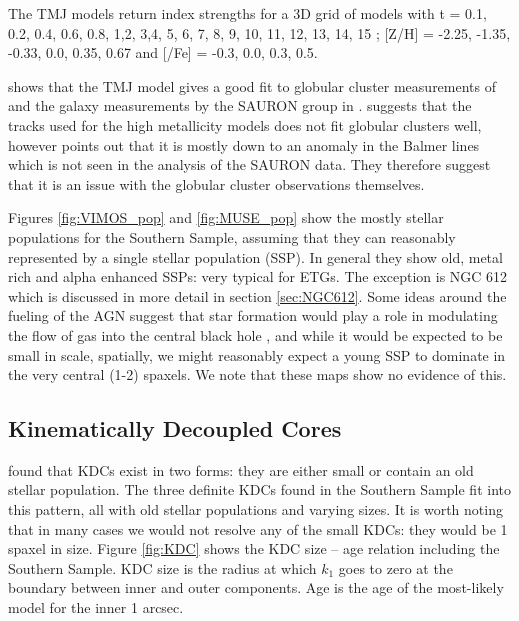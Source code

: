 		The TMJ models return index strengths for a 3D grid of models with t = 0.1, 0.2, 0.4, 0.6, 0.8, 1,2, 3,4, 5, 6, 7, 8, 9, 10, 11, 12, 13, 14, 15 ; [Z/H] = -2.25, -1.35, -0.33, 0.0, 0.35, 0.67 and [\alpha/Fe] = -0.3, 0.0, 0.3, 0.5.  

		\citet{Thomas2010} shows that the TMJ model gives a good fit to globular cluster measurements of \citet{Puzia2002, Schiavon2005} and the galaxy measurements by the SAURON group in \citet{Kuntschner2010}. \citet{Conroy2010} suggests that the \citet{Girardi2000} tracks used for the high metallicity models does not fit globular clusters well, however \citet{Thomas2010} points out that it is mostly down to an anomaly in the Balmer lines which is not seen in the analysis of the SAURON data. They therefore suggest that it is an issue with the globular cluster observations themselves. 

		Figures \ref{fig:VIMOS_pop} and \ref{fig:MUSE_pop} show the mostly stellar populations for the Southern Sample, assuming that they can reasonably represented by a single stellar population (SSP). In general they show old, metal rich and alpha enhanced SSPs: very typical for ETGs. The exception is NGC 612 which is discussed in more detail in section \ref{sec:NGC612}. Some ideas around the fueling of the AGN suggest that star formation would play a role in modulating the flow of gas into the central black hole \citep{}, and while it would be expected to be small in scale, spatially, we might reasonably expect a young SSP to dominate in the very central (1-2) spaxels. We note that these maps show no evidence of this. 


	\subsection{Kinematically Decoupled Cores}
		\label{sec:popKDC}

		\citet{Kuntschner2010} found that KDCs exist in two forms: they are either small or contain an old stellar population. The three definite KDCs found in the Southern Sample fit into this pattern, all with old stellar populations and varying sizes. It is worth noting that in many cases we would not resolve any of the small KDCs: they would be 1 spaxel in size. Figure \ref{fig:KDC} shows the KDC size -- age relation including the Southern Sample. KDC size is the radius at which $k_1$ goes to zero at the boundary between inner and outer components. Age is the age of the most-likely model for the inner 1 arcsec. 

